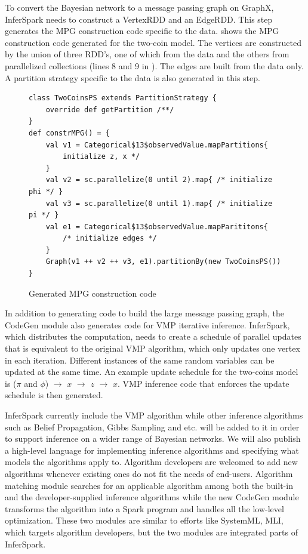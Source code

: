To convert the Bayesian network to a message passing graph on GraphX,
InferSpark needs to construct a VertexRDD and an EdgeRDD. This step generates
the MPG construction code specific to the data.
 shows the MPG construction code
generated for the two-coin model. 
The vertices are constructed by the union
of three RDD's, one of which from the data and the others from 
parallelized collections (lines 8 and 9 in ).
The edges are built from the data only. 
A partition strategy specific to the
data is also generated in this step.


\begin{figure}[h]
\centering
\begin{lstlisting}
class TwoCoinsPS extends PartitionStrategy {
	override def getPartition /**/
}
def constrMPG() = {
	val v1 = Categorical$13$observedValue.mapPartitions{
		initialize z, x */
	}
	val v2 = sc.parallelize(0 until 2).map{ /* initialize phi */ }
	val v3 = sc.parallelize(0 until 1).map{ /* initialize pi */ }
	val e1 = Categorical$13$observedValue.mapParititons{
		/* initialize edges */
	}
	Graph(v1 ++ v2 ++ v3, e1).partitionBy(new TwoCoinsPS())
}
\end{lstlisting}
\caption{Generated MPG construction code}
\label{fig:two_coins_mpg_constr_code}
\end{figure}

In addition to generating code to build the large message passing graph,
the CodeGen module also generates code for VMP iterative inference. 
InferSpark, which
distributes the computation, needs to create a schedule of parallel updates
that is equivalent to the original VMP algorithm, which only updates one vertex
in each iteration. Different instances of the same random variables can be
updated at the same time. An example update schedule for the two-coins model is
($\pi$ and $\phi$) $\rightarrow$ $x$ $\rightarrow$ $z$ $\rightarrow$ $x$. VMP inference code that enforces the update
schedule is then generated. %

InferSpark currently include the VMP algorithm while other inference
algorithms such as Belief Propagation, Gibbs Sampling and etc. will be added
to it in order to support inference on a wider range of Bayesian networks. We
will also publish a high-level language for implementing inference algorithms
and specifying what models the algorithms apply to.  Algorithm developers are
welcomed to add new algorithms whenever existing ones do not fit the needs of
end-users. Algorithm matching module searches for an applicable algorithm
among both the built-in and the developer-supplied inference algorithms while
the new CodeGen module transforms the algorithm into a Spark program and
handles all the low-level optimization. These two modules are similar to
efforts like SystemML, MLI, which targets algorithm developers, but the two
modules are integrated parts of InferSpark.

